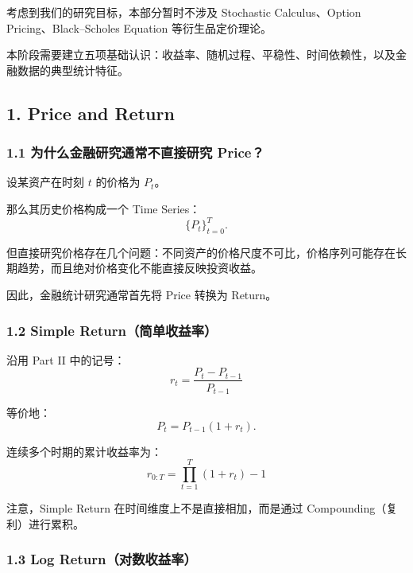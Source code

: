 考虑到我们的研究目标，本部分暂时不涉及 Stochastic Calculus、Option Pricing、Black--Scholes Equation 等衍生品定价理论。

本阶段需要建立五项基础认识：收益率、随机过程、平稳性、时间依赖性，以及金融数据的典型统计特征。

\hypertarget{part-4-52-0001-price-and-return}{%
\subsection{1. Price and Return}\label{part-4-52-0001-price-and-return}}

\hypertarget{part-4-52-0001-ux4e3aux4ec0ux4e48ux91d1ux878dux7814ux7a76ux901aux5e38ux4e0dux76f4ux63a5ux7814ux7a76-price}{%
\subsubsection{1.1 为什么金融研究通常不直接研究 Price？}\label{part-4-52-0001-ux4e3aux4ec0ux4e48ux91d1ux878dux7814ux7a76ux901aux5e38ux4e0dux76f4ux63a5ux7814ux7a76-price}}

设某资产在时刻 \(t\) 的价格为 \(P_t\)。

那么其历史价格构成一个 Time Series：
\[\{P_t\}_{t=0}^{T}.\]

但直接研究价格存在几个问题：不同资产的价格尺度不可比，价格序列可能存在长期趋势，而且绝对价格变化不能直接反映投资收益。

因此，金融统计研究通常首先将 Price 转换为 Return。

\hypertarget{part-4-52-0001-simple-returnux7b80ux5355ux6536ux76caux7387}{%
\subsubsection{1.2 Simple Return（简单收益率）}\label{part-4-52-0001-simple-returnux7b80ux5355ux6536ux76caux7387}}

沿用 Part II 中的记号：
\[\boxed{
r_t=\frac{P_t-P_{t-1}}{P_{t-1}}
}\]

等价地：
\[P_t=P_{t-1}(1+r_t).\]

连续多个时期的累计收益率为：
\[\boxed{
r_{0:T}
=
\prod_{t=1}^{T}(1+r_t)-1
}\]

注意，Simple Return 在时间维度上不是直接相加，而是通过 Compounding（复利）进行累积。

\hypertarget{part-4-52-0001-log-returnux5bf9ux6570ux6536ux76caux7387}{%
\subsubsection{1.3 Log Return（对数收益率）}\label{part-4-52-0001-log-returnux5bf9ux6570ux6536ux76caux7387}}

